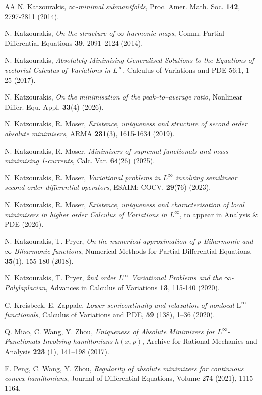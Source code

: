 \documentclass[a4paper,11pt]{article}
\numberwithin{equation}{section}
\theoremstyle{definition}
\begin{document}
\begin{thebibliography}{AA}
N. Katzourakis, {\it $\infty$-minimal submanifolds}, Proc. Amer. Math. Soc. {\bf 142}, 2797-2811 (2014).

N. Katzourakis, {\it On the structure of $\infty$-harmonic maps}, Comm. Partial Differential
Equations {\bf 39}, 2091–2124 (2014).

 N. Katzourakis, \emph{Absolutely Minimising Generalised Solutions to the Equations of vectorial Calculus of Variations in $L^\infty$}, Calculus of Variations and PDE 56:1, 1 - 25 (2017).

N. Katzourakis, {\it On the minimisation of the peak–to–average ratio}, Nonlinear Differ. Equ. Appl. {\bf 33}(4) (2026). 

N. Katzourakis, R. Moser, {\it Existence, uniqueness and structure of second order absolute minimisers}, ARMA {\bf 231}(3), 1615-1634 (2019).

N. Katzourakis, R. Moser, {\it Minimisers of supremal functionals and mass-minimising 1-currents}, Calc. Var.{ \bf 64}(26) (2025).

N. Katzourakis, R. Moser, {\it Variational problems in $L^\infty$ involving semilinear second order differential operators}, ESAIM: COCV, {\bf 29}(76) (2023).

N. Katzourakis, R. Moser, {\it Existence, uniqueness and characterisation of local minimisers in higher order Calculus of Variations in $L^\infty$}, to appear in Analysis \& PDE (2026).

N. Katzourakis, T. Pryer, {\it On the numerical approximation of $p$-Biharmonic and $\infty$-Biharmonic functions},
Numerical Methods for Partial Differential Equations, {\bf 35}(1), 155-180 (2018).

N. Katzourakis, T. Pryer, {\it 2nd order $L^\infty$ Variational Problems and the $\infty$-Polylaplacian},
Advances in Calculus of Variations {\bf 13}, 115-140 (2020).

 C. Kreisbeck, E. Zappale, \emph{Lower semicontinuity and relaxation of nonlocal $\mathrm L^{\infty}$-functionals}, Calculus of Variations and PDE, \textbf{59} (138), 1--36 (2020).

 Q. Miao, C. Wang, Y. Zhou, \emph{Uniqueness of Absolute Minimizers for $ L^{\infty}$-Functionals Involving hamiltonians $h(x,p)$}, Archive for Rational Mechanics and Analysis \textbf{223} (1), 141--198 (2017).

 F. Peng, C. Wang, Y. Zhou, \emph{Regularity of absolute minimizers for continuous convex hamiltonians}, Journal of Differential Equations, Volume 274 (2021), 1115-1164.


\end{thebibliography}
\end{document}
